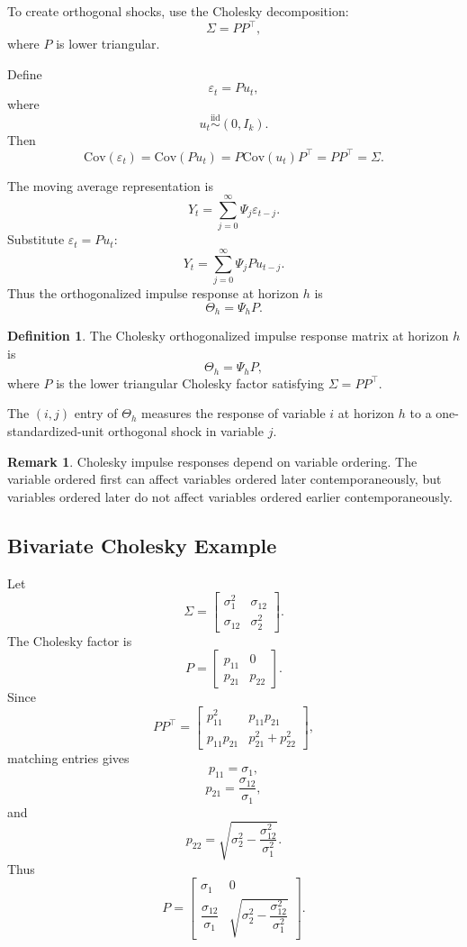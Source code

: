\documentclass[12pt,oneside]{book}
\numberwithin{equation}{section}
\theoremstyle{definition}
\newtheorem{definition}{Definition}[section]
\newtheorem{remark}{Remark}[section]
\theoremstyle{plain}
\theoremstyle{remark}
\newcommand{\Cov}{\mathrm{Cov}}
\newcommand{\iid}{\overset{\text{iid}}{\sim}}
\begin{document}
To create orthogonal shocks, use the Cholesky decomposition:
\[
\Sigma=PP^\top,
\]
where $P$ is lower triangular.

Define
\[
\varepsilon_t=Pu_t,
\]
where
\[
u_t\iid (0,I_k).
\]
Then
\[
\Cov(\varepsilon_t)
=
\Cov(Pu_t)
=
P\Cov(u_t)P^\top
=
PP^\top
=
\Sigma.
\]

The moving average representation is
\[
Y_t
=
\sum_{j=0}^{\infty}\Psi_j\varepsilon_{t-j}.
\]
Substitute $\varepsilon_t=Pu_t$:
\[
Y_t
=
\sum_{j=0}^{\infty}\Psi_jP u_{t-j}.
\]
Thus the orthogonalized impulse response at horizon $h$ is
\[
\Theta_h=\Psi_hP.
\]

\begin{definition}
The Cholesky orthogonalized impulse response matrix at horizon $h$ is
\[
\Theta_h=\Psi_hP,
\]
where $P$ is the lower triangular Cholesky factor satisfying $\Sigma=PP^\top$.
\end{definition}

The $(i,j)$ entry of $\Theta_h$ measures the response of variable $i$ at horizon $h$ to a one-standardized-unit orthogonal shock in variable $j$.

\begin{remark}
Cholesky impulse responses depend on variable ordering. The variable ordered first can affect variables ordered later contemporaneously, but variables ordered later do not affect variables ordered earlier contemporaneously.
\end{remark}

\subsection{Bivariate Cholesky Example}

Let
\[
\Sigma=
\begin{bmatrix}
\sigma_1^2 & \sigma_{12}\\
\sigma_{12} & \sigma_2^2
\end{bmatrix}.
\]
The Cholesky factor is
\[
P=
\begin{bmatrix}
p_{11} & 0\\
p_{21} & p_{22}
\end{bmatrix}.
\]
Since
\[
PP^\top
=
\begin{bmatrix}
p_{11}^2 & p_{11}p_{21}\\
p_{11}p_{21} & p_{21}^2+p_{22}^2
\end{bmatrix},
\]
matching entries gives
\[
p_{11}=\sigma_1,
\]
\[
p_{21}=\frac{\sigma_{12}}{\sigma_1},
\]
and
\[
p_{22}
=
\sqrt{\sigma_2^2-\frac{\sigma_{12}^2}{\sigma_1^2}}.
\]
Thus
\[
P=
\begin{bmatrix}
\sigma_1 & 0\\
\dfrac{\sigma_{12}}{\sigma_1}
&
\sqrt{\sigma_2^2-\dfrac{\sigma_{12}^2}{\sigma_1^2}}
\end{bmatrix}.
\]
\end{document}
